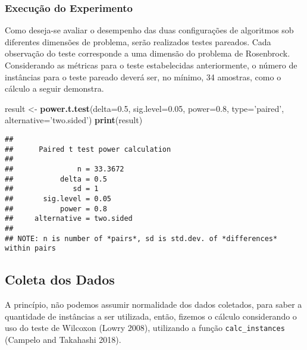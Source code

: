 \documentclass[]{article}
\newenvironment{Shaded}{\begin{snugshade}}{\end{snugshade}}
\newcommand{\DataTypeTok}[1]{\textcolor[rgb]{0.13,0.29,0.53}{#1}}
\newcommand{\DecValTok}[1]{\textcolor[rgb]{0.00,0.00,0.81}{#1}}
\newcommand{\FloatTok}[1]{\textcolor[rgb]{0.00,0.00,0.81}{#1}}
\newcommand{\KeywordTok}[1]{\textcolor[rgb]{0.13,0.29,0.53}{\textbf{#1}}}
\newcommand{\NormalTok}[1]{#1}
\newcommand{\OperatorTok}[1]{\textcolor[rgb]{0.81,0.36,0.00}{\textbf{#1}}}
\newcommand{\StringTok}[1]{\textcolor[rgb]{0.31,0.60,0.02}{#1}}
\begin{document}
\hypertarget{execucao-do-experimento}{%
\subsubsection{Execução do Experimento}\label{execucao-do-experimento}}

Como deseja-se avaliar o desempenho das duas configurações de algoritmos
sob diferentes dimensões de problema, serão realizados testes pareados.
Cada observação do teste corresponde a uma dimensão do problema de
Rosenbrock. Considerando as métricas para o teste estabelecidas
anteriormente, o número de instâncias para o teste pareado deverá ser,
no mínimo, 34 amostras, como o cálculo a seguir demonstra.

\begin{Shaded}
\begin{Highlighting}[]
\NormalTok{result <-}\StringTok{ }\KeywordTok{power.t.test}\NormalTok{(}\DataTypeTok{delta=}\FloatTok{0.5}\NormalTok{,}
             \DataTypeTok{sig.level=}\FloatTok{0.05}\NormalTok{,}
             \DataTypeTok{power=}\FloatTok{0.8}\NormalTok{,}
             \DataTypeTok{type=}\StringTok{'paired'}\NormalTok{,}
             \DataTypeTok{alternative=}\StringTok{'two.sided'}\NormalTok{)}
\KeywordTok{print}\NormalTok{(result)}
\end{Highlighting}
\end{Shaded}

\begin{verbatim}
## 
##      Paired t test power calculation 
## 
##               n = 33.3672
##           delta = 0.5
##              sd = 1
##       sig.level = 0.05
##           power = 0.8
##     alternative = two.sided
## 
## NOTE: n is number of *pairs*, sd is std.dev. of *differences* within pairs
\end{verbatim}

\hypertarget{coleta-dos-dados}{%
\subsection{Coleta dos Dados}\label{coleta-dos-dados}}

A princípio, não podemos assumir normalidade dos dados coletados, para
saber a quantidade de instâncias a ser utilizada, então, fizemos o
cálculo considerando o uso do teste de Wilcoxon (Lowry 2008), utilizando
a função \texttt{calc\_instances} (Campelo and Takahashi 2018).

\begin{Shaded}
\end{Shaded}
\end{document}
